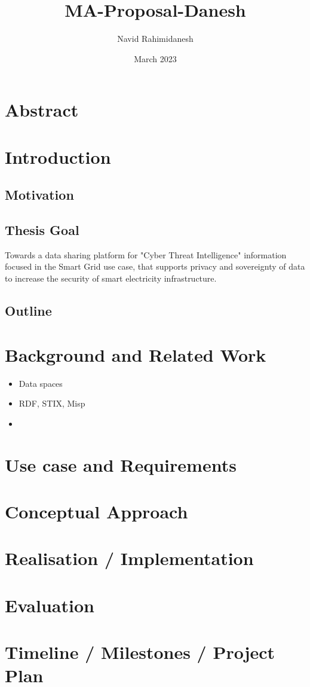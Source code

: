 \documentclass{article}
\title{MA-Proposal-Danesh}
\author{Navid Rahimidanesh}
\date{March 2023}
\begin{document}
\maketitle

\section{Abstract}

\section{Introduction}

\subsection{Motivation}

\subsection{Thesis Goal}

Towards a data sharing platform for "Cyber Threat Intelligence" information focused in the Smart Grid use case, that supports privacy and sovereignty of data to increase the security of smart electricity infrastructure.

\subsection{Outline}


\section{Background and Related Work}

\begin{itemize}
    \item Data spaces
    \item RDF, STIX, Misp
    \item 
    
\end{itemize}

\section{Use case and Requirements}

\section{Conceptual Approach}

\section{Realisation / Implementation}

\section{Evaluation}

\section{Timeline / Milestones / Project Plan}
\end{document}
